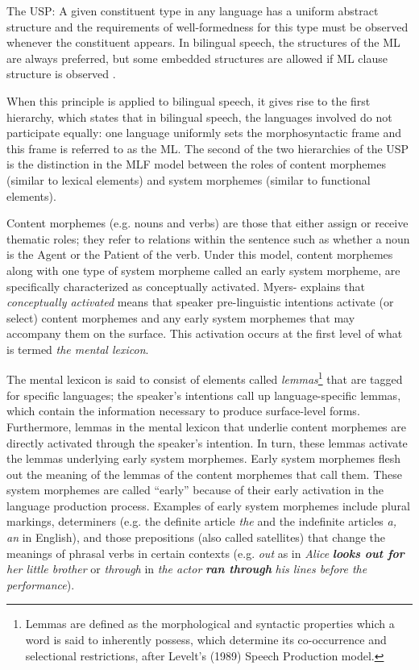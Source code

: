 \documentclass[output=paper]{langsci/langscibook}
\begin{document}
The USP: A given constituent type in any language has a uniform abstract structure and the requirements of well-formedness for this type must be observed whenever the constituent appears. In bilingual speech, the structures of the ML are always preferred, but some embedded structures are allowed if ML clause structure is observed \citep[8--9]{MyersScotton2002}.

When this principle is applied to bilingual speech, it gives rise to the first hierarchy, which states that in bilingual speech, the languages involved do not participate equally: one language uniformly sets the morphosyntactic frame and this frame is referred to as the ML. The second of the two hierarchies of the USP is the distinction in the MLF model between the roles of content morphemes (similar to lexical elements) and system morphemes (similar to functional elements). 

Content morphemes (e.g. nouns and verbs) are those that either assign or receive thematic roles; they refer to relations within the sentence such as whether a noun is the Agent or the Patient of the verb. Under this model, content morphemes along with one type of system morpheme called an early system morpheme, are specifically characterized as conceptually activated. Myers-\citet{Scotton2002} explains that \textit{conceptually activated} means that speaker pre-linguistic intentions activate (or select) content morphemes and any early system morphemes that may accompany them on the surface. This activation occurs at the first level of what is termed \textit{the mental lexicon}.

The mental lexicon is said to consist of elements called \textit{lemmas}\footnote{Lemmas are defined as the morphological and syntactic properties which a word is said to inherently possess, which determine its co-occurrence and selectional restrictions, after Levelt’s (1989) Speech Production model.} that are tagged for specific languages; the speaker’s intentions call up language-specific lemmas, which contain the information necessary to produce surface-level forms. Furthermore, lemmas in the mental lexicon that underlie content morphemes are directly activated through the speaker’s intention. In turn, these lemmas activate the lemmas underlying early system morphemes. Early system morphemes flesh out the meaning of the lemmas of the content morphemes that call them. These system morphemes are called “early” because of their early activation in the language production process. Examples of early system morphemes \citep[268]{MyersScotton2006} include plural markings, determiners (e.g. the definite article \textit{the} and the indefinite articles \textit{a, an} in English), and those prepositions (also called satellites) that change the meanings of phrasal verbs in certain contexts (e.g. \textit{out} as in \textit{Alice} \textbf{\textit{looks out for}}\textit{ her little brother} or \textit{through} in \textit{the actor} \textbf{\textit{ran through}}\textit{ his lines before the performance}).
\end{document}
